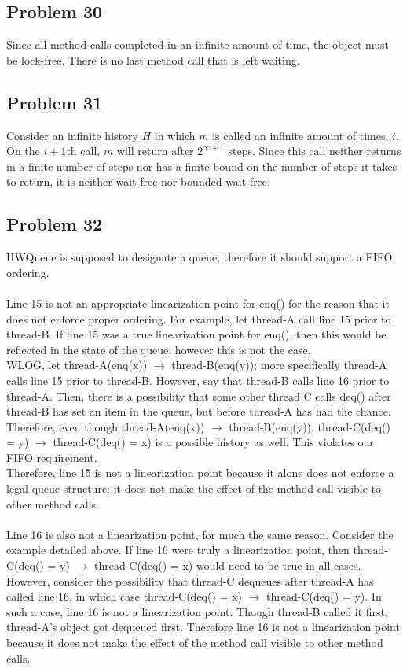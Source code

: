 \documentclass[]{article}
\begin{document}
\subsection{Problem 30}
Since all method calls completed in an infinite amount of time, the object must be lock-free. There is no last method call that is left waiting.

\subsection{Problem 31}
Consider an infinite history $H$ in which $m$ is called an infinite amount of times, $i$. On the $i + 1$th call, $m$ will return after $2^{\infty + 1}$ steps. Since this call neither returns in a finite number of steps nor has a finite bound on the number of steps it takes to return, it is neither wait-free nor bounded wait-free.


\subsection{Problem 32}
HWQueue is supposed to designate a queue; therefore it should support a FIFO ordering.
\\\\
Line 15 is not an appropriate linearization point for enq() for the reason that it does not enforce proper ordering. For example, let thread-A call line 15 prior to thread-B. If line 15 was a true linearization point for enq(), then this would be reflected in the state of the queue; however this is not the case.
\\
WLOG, let thread-A(enq(x)) $\rightarrow$ thread-B(enq(y)); more specifically thread-A calls line 15 prior to thread-B. However, say that thread-B calls line 16 prior to thread-A. Then, there is a possibility that some other thread C calls deq() after thread-B has set an item in the queue, but before thread-A has had the chance. Therefore, even though thread-A(enq(x)) $\rightarrow$ thread-B(enq(y)), thread-C(deq() = y) $\rightarrow$ thread-C(deq() = x) is a possible history as well. This violates our FIFO requirement.
\\
Therefore, line 15 is not a linearization point because it alone does not enforce a legal queue structure; it does not make the effect of the method call visible to other method calls.
\\\\
Line 16 is also not a linearization point, for much the same reason. Consider the example detailed above. If line 16 were truly a linearization point, then thread-C(deq() = y) $\rightarrow$ thread-C(deq() = x) would need to be true in all cases. However, consider the possibility that thread-C dequeues after thread-A has called line 16, in which case thread-C(deq() = x) $\rightarrow$ thread-C(deq() = y). In such a case, line 16 is not a linearization point. Though thread-B called it first, thread-A's object got dequeued first. Therefore line 16 is not a linearization point because it does not make the effect of the method call visible to other method calls.


	
	
\end{document}
